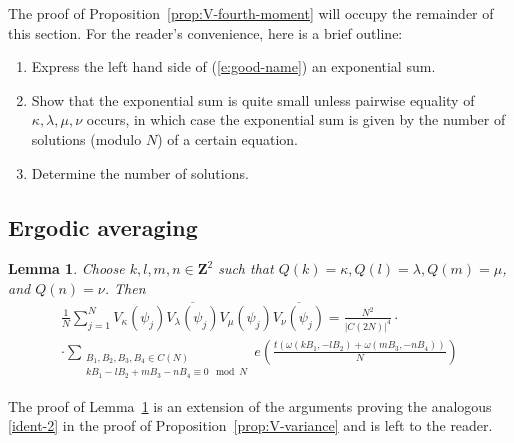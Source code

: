 \documentclass[12pt]{amsart}
\newtheorem{lem}[thm]{Lemma}%
\theoremstyle{plain}
\newcommand{\Z}{{\mathbf Z}}
\newcommand{\torus}{C(N)} %
\newcommand{\torusN}{C(2N)}%
\renewcommand{\^}{\widehat}
\newcommand{\V}[1]{V_{#1}(\psi_j)}
\newcommand{\vnn}{\nu}
\newcommand{\vnm}{\mu}
\newcommand{\vnk}{\kappa}
\newcommand{\vnl}{\lambda}
\begin{document}
The proof of Proposition~\ref{prop:V-fourth-moment} will occupy
the remainder of this section. For the reader's convenience,  
here is a brief outline:
\begin{enumerate}
\item Express the left hand side of (\ref{e:good-name}) an exponential sum.
\item Show that the exponential sum is quite small unless pairwise
  equality of $\kappa,\lambda,\mu,\nu$ occurs, in which case the
  exponential sum is given by the number of solutions (modulo $N$) of
  a certain equation.
\item Determine the number of solutions.%
\end{enumerate}



\subsection{Ergodic averaging} 
\begin{lem}\label{lem:tedious} 
Choose $k,l,m,n \in \Z^2$ such that $Q(k)
= \vnk, Q(l) = \vnl, Q(m) = \vnm$, and $Q(n) = \vnn$. Then 
\begin{multline}  \label{eq:10}
\frac{1}{N}
\sum_{j=1}^N
\V{\vnk}
\overline{\V{\vnl}}
\V{\vnm}
\overline{\V{\vnn}}
= 
\frac{N^2}{|\torusN|^4} 
\cdot \\ \cdot
\sum_{\substack{B_1, B_2, B_3, B_4 \in \torus \\
kB_1-lB_2+mB_3-nB_4 \equiv 0 \mod N}}
e \left( \frac{t(\omega(kB_1,-l B_2)+\omega(mB_3,-n B_4))  }{N} \right) 
\end{multline}
\end{lem} 
The proof of Lemma~\ref{lem:tedious} 
is an extension of the arguments proving the analogous
\eqref{ident-2} in the proof of Proposition~\ref{prop:V-variance}  
and is  left to the  reader. 
\end{document}

